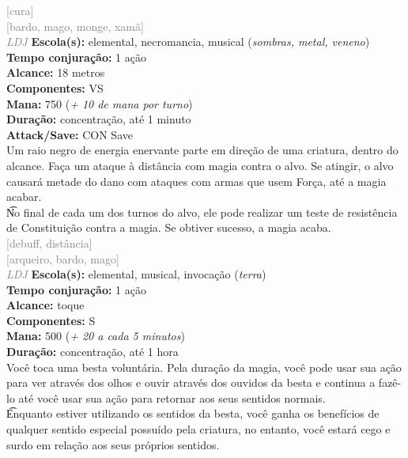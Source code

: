 \documentclass{RPG_Adventure}[2021/10/20]
\begin{document}
{\scriptsize \textcolor{gray}{[cura]\\}}
{\scriptsize \textcolor{gray}{[bardo, mago, monge, xamã]\\}}
{\tiny \textcolor{gray}{\textit{LDJ}}}\jump{}
{\small \t \textbf{Escola(s):} elemental, necromancia, musical (\textit{sombras, metal, veneno})\\\t \textbf{Tempo conjuração:} 1 ação\\\t \textbf{Alcance:} 18 metros\\\t \textbf{Componentes:} VS\\\t \textbf{Mana:} 750 (\textit{+ 10 de mana por turno})\\\t \textbf{Duração:} concentração, até 1 minuto\\\t \textbf{Attack/Save:} CON Save\\}
{\normalsize Um raio negro de energia enervante parte em direção de uma criatura, dentro do alcance. Faça um ataque à distância com magia contra o alvo. Se atingir, o alvo causará metade do dano com ataques com armas que usem Força, até a magia acabar.\\\t No final de cada um dos turnos do alvo, ele pode realizar um teste de resistência de Constituição contra a magia. Se obtiver sucesso, a magia acaba.\\}
{\scriptsize \textcolor{gray}{[debuff, distância]\\}}
{\scriptsize \textcolor{gray}{[arqueiro, bardo, mago]\\}}
{\tiny \textcolor{gray}{\textit{LDJ}}}\jump{}
{\small \t \textbf{Escola(s):} elemental, musical, invocação (\textit{terra})\\\t \textbf{Tempo conjuração:} 1 ação\\\t \textbf{Alcance:} toque\\\t \textbf{Componentes:} S\\\t \textbf{Mana:} 500 (\textit{+ 20 a cada 5 minutos})\\\t \textbf{Duração:} concentração, até 1 hora\\}
{\normalsize Você toca uma besta voluntária. Pela duração da magia, você pode usar sua ação para ver através dos olhos e ouvir através dos ouvidos da besta e continua a fazê-lo até você usar sua ação para retornar aos seus sentidos normais.\\\t Enquanto estiver utilizando os sentidos da besta, você ganha os benefícios de qualquer sentido especial possuído pela criatura, no entanto, você estará cego e surdo em relação aos seus próprios sentidos.\\}
\end{document}
